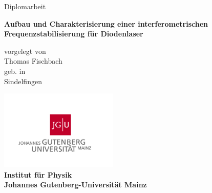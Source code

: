 

\thispagestyle{plain}
\begin{titlepage}
\begin{center}

\vspace*{0.5cm}

\Large{Diplomarbeit}\\

\vspace*{2.2cm}

\fontsize{25pt}{34pt}\selectfont
\bf{Aufbau und Charakterisierung einer interferometrischen Frequenzstabilisierung für Diodenlaser}

\vspace*{1.5cm}
\normalsize{vorgelegt von}\\
\Large{Thomas Fischbach}\\
\normalsize{geb. in}\\
\Large{Sindelfingen}

\vspace*{3.5cm}
\includegraphics[width=0.42\textwidth]{gfx/JGU-Logo}\\
\bf{Institut für Physik}\\
Johannes Gutenberg-Universität Mainz\\
\vspace*{1cm}
\normalsize\mdseries{\today}\\

\end{center}
\end{titlepage}

\tableofcontents
\listoffigures
\listoftables


